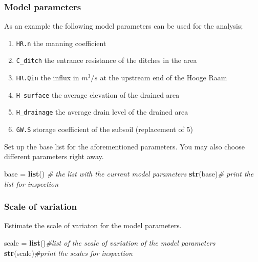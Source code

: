\documentclass[
]{article}
\newenvironment{Shaded}{\begin{snugshade}}{\end{snugshade}}
\newcommand{\CommentTok}[1]{\textcolor[rgb]{0.56,0.35,0.01}{\textit{#1}}}
\newcommand{\FunctionTok}[1]{\textcolor[rgb]{0.13,0.29,0.53}{\textbf{#1}}}
\newcommand{\NormalTok}[1]{#1}
\newcommand{\OtherTok}[1]{\textcolor[rgb]{0.56,0.35,0.01}{#1}}
\providecommand{\tightlist}{%
  \setlength{\itemsep}{0pt}\setlength{\parskip}{0pt}}
\begin{document}
\hypertarget{model-parameters}{%
\subsubsection{Model parameters}\label{model-parameters}}

As an example the following model parameters can be used for the
analysis;

\begin{enumerate}
\def\labelenumi{\arabic{enumi}.}
\tightlist
\item
  \texttt{HR.n} the manning coefficient
\item
  \texttt{C\_ditch} the entrance resistance of the ditches in the area
\item
  \texttt{HR.Qin} the influx in \(m^3/s\) at the upstream end of the
  Hooge Raam
\item
  \texttt{H\_surface} the average elevation of the drained area
\item
  \texttt{H\_drainage} the average drain level of the drained area
\item
  \texttt{GW.S} storage coefficient of the subsoil (replacement of 5)
\end{enumerate}

Set up the base list for the aforementioned parameters. You may also
choose different parameters right away.

\begin{Shaded}
\begin{Highlighting}[]
\NormalTok{base }\OtherTok{=} \FunctionTok{list}\NormalTok{() }\CommentTok{\# the list with the current model parameters}
\FunctionTok{str}\NormalTok{(base)}\CommentTok{\# print the list for inspection}
\end{Highlighting}
\end{Shaded}

\hypertarget{scale-of-variation}{%
\subsubsection{Scale of variation}\label{scale-of-variation}}

Estimate the scale of variaton for the model parameters.

\begin{Shaded}
\begin{Highlighting}[]
\NormalTok{scale }\OtherTok{=} \FunctionTok{list}\NormalTok{()}\CommentTok{\#list of the scale of variation of the model parameters}
\FunctionTok{str}\NormalTok{(scale)}\CommentTok{\#print the scales for inspection}
\end{Highlighting}
\end{Shaded}
\end{document}
